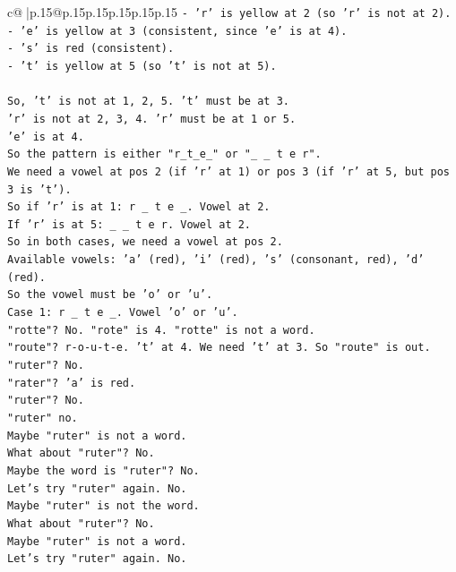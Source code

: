 \documentclass{article}
\begin{document}
{\begin{supertabular}{c@{$\;$}|p{.15\linewidth}@{}p{.15\linewidth}p{.15\linewidth}p{.15\linewidth}p{.15\linewidth}p{.15\linewidth}}
{{{\texttt{{-} 'r' is yellow at 2 (so 'r' is not at 2).} \\
\texttt{{-} 'e' is yellow at 3 (consistent, since 'e' is at 4).} \\
\texttt{{-} 's' is red (consistent).} \\
\texttt{{-} 't' is yellow at 5 (so 't' is not at 5).} \\
\\ 
\texttt{So, 't' is not at 1, 2, 5. 't' must be at 3.} \\
\texttt{'r' is not at 2, 3, 4. 'r' must be at 1 or 5.} \\
\texttt{'e' is at 4.} \\
\texttt{So the pattern is either "r\_t\_e\_" or "\_ \_ t e r".} \\
\texttt{We need a vowel at pos 2 (if 'r' at 1) or pos 3 (if 'r' at 5, but pos 3 is 't').} \\
\texttt{So if 'r' is at 1: r \_ t e \_. Vowel at 2.} \\
\texttt{If 'r' is at 5: \_ \_ t e r. Vowel at 2.} \\
\texttt{So in both cases, we need a vowel at pos 2.} \\
\texttt{Available vowels: 'a' (red), 'i' (red), 's' (consonant, red), 'd' (red).} \\
\texttt{So the vowel must be 'o' or 'u'.} \\
\texttt{Case 1: r \_ t e \_. Vowel 'o' or 'u'.} \\
\texttt{"rotte"? No. "rote" is 4. "rotte" is not a word.} \\
\texttt{"route"? r{-}o{-}u{-}t{-}e. 't' at 4. We need 't' at 3. So "route" is out.} \\
\texttt{"ruter"? No.} \\
\texttt{"rater"? 'a' is red.} \\
\texttt{"ruter"? No.} \\
\texttt{"ruter" no.} \\
\texttt{Maybe "ruter" is not a word.} \\
\texttt{What about "ruter"? No.} \\
\texttt{Maybe the word is "ruter"? No.} \\
\texttt{Let's try "ruter" again. No.} \\
\texttt{Maybe "ruter" is not the word.} \\
\texttt{What about "ruter"? No.} \\
\texttt{Maybe "ruter" is not a word.} \\
\texttt{Let's try "ruter" again. No.} \\
}}}
\end{supertabular}}
\end{document}
